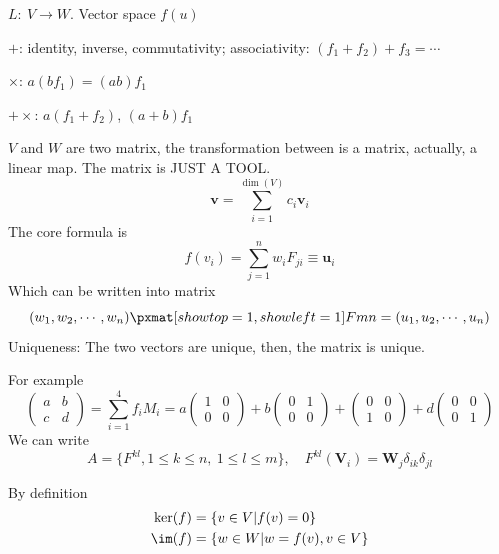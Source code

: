 \begin{solution}[By TA]\leavevmode
  \begin{enumext}
    \item $L:\ V \to W$. Vector space $f(u)$
    \begin{enumext}
      \item $+$: identity, inverse, commutativity;
      associativity: $(f_1 + f_2) + f_3 = \cdots$
      \item $\times$: $a(bf_1) = (ab)f_1$ 
      \item $+\times$: $a(f_1 + f_2)$, $(a + b)f_1$
    \end{enumext}
    \item $V$ and $W$ are two matrix, the transformation between is a matrix,
    actually, a linear map. The matrix is JUST A TOOL.
    \[
      \bm v = \sum_{i=1}^{\dim(V)} c_i \bm v_i
    \]
    The core formula is
    \[
      f(v_i) = \sum_{j=1}^n w_i F_{ji} \equiv \bm u_i
    \]
    Which can be written into matrix
    \[
      (w_1, w_2, \cdots, w_n)
      \pxmat[showtop = 1, showleft = 1]Fmn =
      (u_1, u_2, \cdots, u_n)
    \]
    Uniqueness: The two vectors are unique, then, the matrix is unique.
    \item For example
    \[
      \begin{pmatrix}
        a & b\\ c& d
      \end{pmatrix} = \sum_{i=1}^4 f_i M_i
      = a\begin{pmatrix}
        1 & 0\\0 & 0
      \end{pmatrix} + b\begin{pmatrix}
        0 & 1\\0 & 0
      \end{pmatrix} + \begin{pmatrix}
        0 & 0\\1 & 0
      \end{pmatrix} + d\begin{pmatrix}
        0 & 0\\0 & 1
      \end{pmatrix}
    \]
    We can write
    \[
      A = \{F^{kl}, 1 \leq k \leq n,\ 1 \leq l \leq m\}, \quad
      F^{kl}(\bm V_i) = \bm W_j \delta_{ik} \delta_{jl}
    \]
    \item By definition
    \begin{align*}
      \ker(f) & = \{v \in V|f(v) = 0\}\\
      \im(f)  & = \{w\in W|w = f(v), v \in V\}\\

\end{align*}
\end{enumext}
\end{solution}
